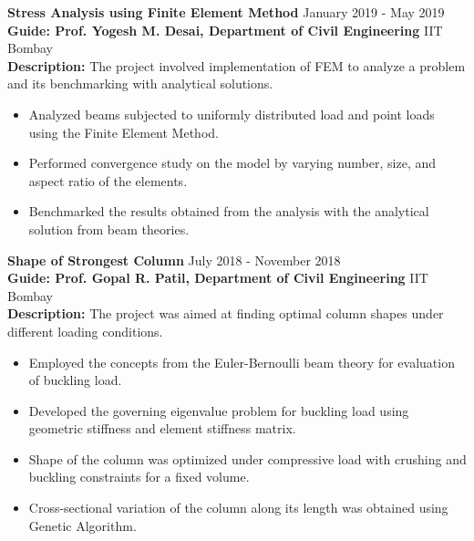 \textbf{Stress Analysis using Finite Element Method} \hfill{January 2019 - May 2019}\\
\textbf{Guide: Prof. Yogesh M. Desai, Department of Civil Engineering} \hfill{IIT Bombay} \\
\textbf{Description:} {The project involved implementation of FEM to analyze a problem and its benchmarking with analytical solutions.}
\begin{itemize}
    \setlength\itemsep{0.7mm}
    \item  Analyzed beams subjected to uniformly distributed load and point loads using the Finite Element Method.
    \item Performed convergence study on the model by varying number, size, and aspect ratio of the elements.
    \item Benchmarked the results obtained from the analysis with the analytical solution from beam theories.
    
\end{itemize}

\textbf{Shape of Strongest Column} \hfill{July 2018 - November 2018}\\
\textbf{Guide: Prof. Gopal R. Patil, Department of Civil Engineering} \hfill{IIT Bombay} \\
\textbf{Description:} {The project was aimed at finding optimal column shapes under different loading conditions.}
\begin{itemize}
    \setlength\itemsep{0.7mm}
    \item Employed the concepts from the Euler-Bernoulli beam theory for evaluation of buckling load.
    \item Developed the governing eigenvalue problem for buckling load using geometric stiffness and element stiffness matrix. 
    \item Shape of the column was optimized under compressive load with crushing and buckling constraints for a fixed volume.
    \item Cross-sectional variation of the column along its length was obtained using Genetic Algorithm.
\end{itemize}



